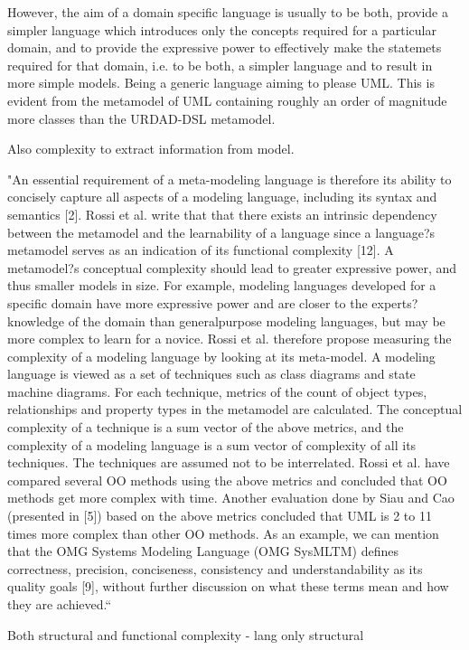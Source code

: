 However, the aim of a domain specific language is usually to be both, provide a simpler language which introduces only the concepts required for a particular domain, and to provide the expressive power to effectively make the statemets required for that domain, i.e. to be both, a simpler language and to result in more simple models. Being a generic language aiming to please UML. This is evident from the metamodel of UML containing roughly an order of magnitude more classes than the URDAD-DSL metamodel.

Also complexity to extract information from model.

"An essential
requirement of a meta-modeling language is therefore
its ability to concisely capture all aspects of a modeling
language, including its syntax and semantics [2]. Rossi
et al. write that that there exists an intrinsic
dependency between the metamodel and the
learnability of a language since a language?s metamodel
serves as an indication of its functional
complexity [12]. A metamodel?s conceptual
complexity should lead to greater expressive power,
and thus smaller models in size. For example,
modeling languages developed for a specific domain
have more expressive power and are closer to the
experts? knowledge of the domain than generalpurpose
modeling languages, but may be more
complex to learn for a novice.
Rossi et al. therefore propose measuring the
complexity of a modeling language by looking at its
meta-model. A modeling language is viewed as a set of
techniques such as class diagrams and state machine
diagrams. For each technique, metrics of the count of
object types, relationships and property types in the
metamodel are calculated. The conceptual complexity
of a technique is a sum vector of the above metrics,
and the complexity of a modeling language is a sum
vector of complexity of all its techniques. The
techniques are assumed not to be interrelated. Rossi et
al. have compared several OO methods using the above
metrics and concluded that OO methods get more
complex with time. Another evaluation done by Siau
and Cao (presented in [5]) based on the above metrics
concluded that UML is 2 to 11 times more complex
than other OO methods.
As an example, we can mention that the OMG
Systems Modeling Language (OMG SysMLTM) defines
correctness, precision, conciseness, consistency and
understandability as its quality goals [9], without
further discussion on what these terms mean and how
they are achieved.``


Both structural and functional complexity - lang only structural


